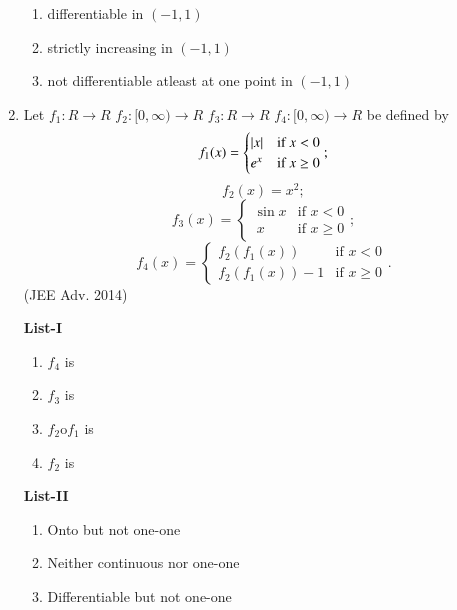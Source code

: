\documentclass[journal,12pt,twocolumn]{IEEEtran}
\theoremstyle{remark}
\begin{document}
\begin{enumerate}
\begin{multicols}{2}
\begin{enumerate}
					\item differentiable in $(-1,1)$

					\item strictly increasing in $(-1,1)$

					\item  not differentiable atleast at one point in  $(-1,1)$
				\end{enumerate}
			\end{multicols}
		\item Let $f_1:R\to R$ $f_2:[0,\infty)\to R$ $f_3:R\to R$ $f_4:[0,\infty)\to R$ be defined by
		$$f_1(x)=
        \begin{cases}
		\left\vert x\right\vert & \text{if } x < 0 \\
                 e^x & \text{if } x \geq 0 
                 \end{cases};$$
		 $$f_2(x)=x^2;$$
		 $$f_3(x) =
                 \begin{cases}
			 \sin{x} & \text{if }  x < 0 \\
                    \ x & \text{if }  x\geq 0
                  \end{cases};$$
	        $$f_4(x) =
                  \begin{cases}
                     f_2(f_1(x)) & \text{if } x < 0 \\
                     f_2(f_1(x))-1 & \text{if } x \geq 0 
                  \end{cases}.$$
                  \hfill(JEE Adv. 2014)
                 \begin{multicols}{2} 
				\textbf{List-I} 
				\begin{enumerate}[label=\Alph*., start=16]
					\item $f_4$ is
					\item $f_3$ is 
					\item $f_2$o$f_1$ is 
					\item $f_2$ is
				\end{enumerate}
				\columnbreak
				\textbf{List-II}
				\begin{enumerate}[label=\arabic*.]
					\item  Onto but not one-one 

					\item  Neither continuous nor one-one 

					\item  Differentiable but not one-one 


\end{enumerate}
\end{multicols}
\end{enumerate}
\end{document}
